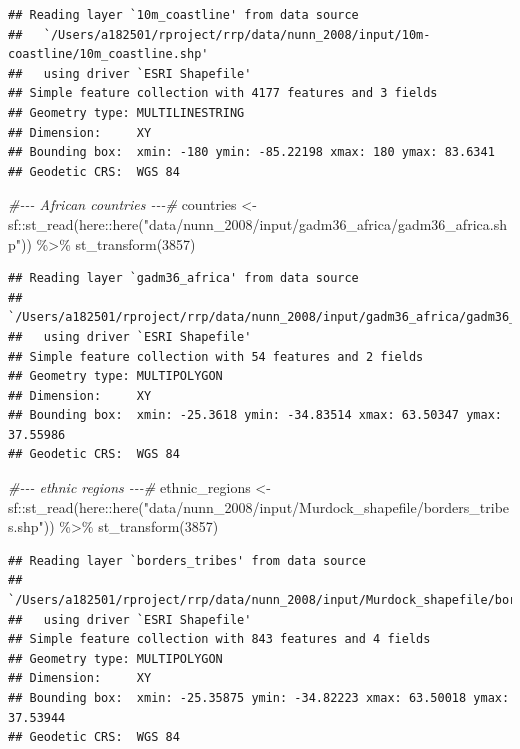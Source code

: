 \documentclass[
  oneside]{book}
\newenvironment{Shaded}{\begin{snugshade}}{\end{snugshade}}
\newcommand{\CommentTok}[1]{\textcolor[rgb]{0.56,0.35,0.01}{\textit{#1}}}
\newcommand{\DecValTok}[1]{\textcolor[rgb]{0.00,0.00,0.81}{#1}}
\newcommand{\FunctionTok}[1]{\textcolor[rgb]{0.00,0.00,0.00}{#1}}
\newcommand{\NormalTok}[1]{#1}
\newcommand{\OtherTok}[1]{\textcolor[rgb]{0.56,0.35,0.01}{#1}}
\newcommand{\SpecialCharTok}[1]{\textcolor[rgb]{0.00,0.00,0.00}{#1}}
\newcommand{\StringTok}[1]{\textcolor[rgb]{0.31,0.60,0.02}{#1}}
\begin{document}
\begin{verbatim}
## Reading layer `10m_coastline' from data source 
##   `/Users/a182501/rproject/rrp/data/nunn_2008/input/10m-coastline/10m_coastline.shp' 
##   using driver `ESRI Shapefile'
## Simple feature collection with 4177 features and 3 fields
## Geometry type: MULTILINESTRING
## Dimension:     XY
## Bounding box:  xmin: -180 ymin: -85.22198 xmax: 180 ymax: 83.6341
## Geodetic CRS:  WGS 84
\end{verbatim}

\begin{Shaded}
\begin{Highlighting}[]
\CommentTok{\#{-}{-}{-} African countries {-}{-}{-}\#}
\NormalTok{countries }\OtherTok{\textless{}{-}}
\NormalTok{  sf}\SpecialCharTok{::}\FunctionTok{st\_read}\NormalTok{(here}\SpecialCharTok{::}\FunctionTok{here}\NormalTok{(}\StringTok{"data/nunn\_2008/input/gadm36\_africa/gadm36\_africa.shp"}\NormalTok{)) }\SpecialCharTok{\%\textgreater{}\%}
  \FunctionTok{st\_transform}\NormalTok{(}\DecValTok{3857}\NormalTok{)}
\end{Highlighting}
\end{Shaded}

\begin{verbatim}
## Reading layer `gadm36_africa' from data source 
##   `/Users/a182501/rproject/rrp/data/nunn_2008/input/gadm36_africa/gadm36_africa.shp' 
##   using driver `ESRI Shapefile'
## Simple feature collection with 54 features and 2 fields
## Geometry type: MULTIPOLYGON
## Dimension:     XY
## Bounding box:  xmin: -25.3618 ymin: -34.83514 xmax: 63.50347 ymax: 37.55986
## Geodetic CRS:  WGS 84
\end{verbatim}

\begin{Shaded}
\begin{Highlighting}[]
\CommentTok{\#{-}{-}{-} ethnic regions {-}{-}{-}\#}
\NormalTok{ethnic\_regions }\OtherTok{\textless{}{-}}
\NormalTok{  sf}\SpecialCharTok{::}\FunctionTok{st\_read}\NormalTok{(here}\SpecialCharTok{::}\FunctionTok{here}\NormalTok{(}\StringTok{"data/nunn\_2008/input/Murdock\_shapefile/borders\_tribes.shp"}\NormalTok{)) }\SpecialCharTok{\%\textgreater{}\%}
  \FunctionTok{st\_transform}\NormalTok{(}\DecValTok{3857}\NormalTok{)}
\end{Highlighting}
\end{Shaded}

\begin{verbatim}
## Reading layer `borders_tribes' from data source 
##   `/Users/a182501/rproject/rrp/data/nunn_2008/input/Murdock_shapefile/borders_tribes.shp' 
##   using driver `ESRI Shapefile'
## Simple feature collection with 843 features and 4 fields
## Geometry type: MULTIPOLYGON
## Dimension:     XY
## Bounding box:  xmin: -25.35875 ymin: -34.82223 xmax: 63.50018 ymax: 37.53944
## Geodetic CRS:  WGS 84
\end{verbatim}
\end{document}
